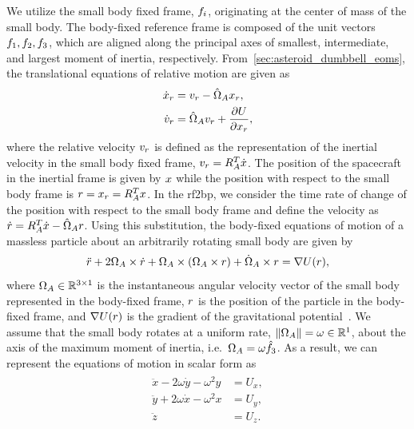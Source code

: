 We utilize the small body fixed frame, \( f_{i} \), originating at the center of mass of the small body.
The body-fixed reference frame is composed of the unit vectors \( f_{1} , f_{2}, f_{3} \), which are aligned along the principal axes of smallest, intermediate, and largest moment of inertia, respectively.
From~\cref{sec:asteroid_dumbbell_eoms}, the translational equations of relative motion are given as
\begin{align*}
    \dot{x}_r &= v_r - \hat{\Omega}_A x_r, \\
     \dot{v}_r  &= \hat{\Omega}_A v_r +  \frac{\partial U}{\partial x_r},
\end{align*}
where the relative velocity \( v_r \) is defined as the representation of the inertial velocity in the small body fixed frame, \( v_r = R_A^T \dot{x}\).
The position of the spacecraft in the inertial frame is given by \( x \) while the position with respect to the small body frame is \( r = x_r = R_A^T x \).
In the \gls{rf2bp}, we consider the time rate of change of the position with respect to the small body frame and define the velocity as \( \dot{r} = R_A^T \dot{x} - \hat{\Omega}_A r \).
Using this substitution, the body-fixed equations of motion of a massless particle about an arbitrarily rotating small body are given by
\begin{align}\label{eq:body_eoms}
    \ddot{r} + 2 \Omega_A \times \dot{r} + \Omega_A \times \left(  \Omega_A \times r  \right) + \dot{\Omega}_A \times r = \nabla U(r) ,
\end{align}
where \( \Omega_A \in \mathbb{R}^{3 \times 1}\) is the instantaneous angular velocity vector of the small body represented in the body-fixed frame, \( r \) is the position of the particle in the body-fixed frame, and \( \nabla U(r) \) is the gradient of the gravitational potential~\cite{scheeres2012a}.
We assume that the small body rotates at a uniform rate, \( \left\| \Omega_A \right\| = \omega \in \mathbb{R}^1 \), about the axis of the maximum moment of inertia, i.e.\ \( \Omega_A = \omega \hat{f_{3}}\).
As a result, we can represent the equations of motion in scalar form as
\begin{align} \label{eq:eoms}
    \begin{split}
        \ddot{x} - 2 \omega \dot{y} - \omega^2 y &= U_x , \\
        \ddot{y} + 2 \omega \dot{x} - \omega^2 x &= U_y , \\
        \ddot{z} &= U_z .
    \end{split}
\end{align}

